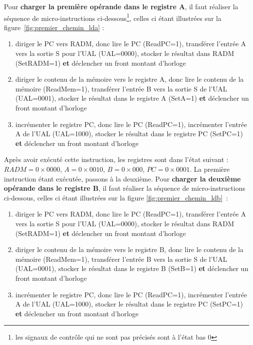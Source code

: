 Pour \textbf{charger la première opérande dans le registre A}, il faut réaliser la séquence de micro-instructions ci-dessous\footnote{les signaux de contrôle qui ne sont pas précisés sont à l'état bas $0$}, celles ci étant illustrées sur la figure~\ref{fig:premier_chemin_lda} :
\begin{enumerate}
\item diriger le PC vers RADM, donc lire le PC (ReadPC=1), transférer l'entrée A vers la sortie S pour l'UAL (UAL=0000), stocker le résultat dans RADM (SetRADM=1) \textbf{et} déclencher un front montant d'horloge
\item diriger le contenu de la mémoire vers le registre A, donc lire le contenu de la mémoire (ReadMem=1), transférer l'entrée B vers la sortie S de l'UAL (UAL=0001), stocker le résultat dans le registre A (SetA=1) \textbf{et} déclencher un front montant d'horloge
\item incrémenter le registre PC, donc lire le PC (ReadPC=1), incrémenter l'entrée A de l'UAL (UAL=1000), stocker le résultat dans le registre PC (SetPC=1) \textbf{et} déclencher un front montant d'horloge
\end{enumerate}

Après avoir exécuté cette instruction, les registres sont dans l'état suivant : $RADM=0\times0000$, $A=0\times0010$, $B=0\times000$, $PC=0\times0001$. La première instruction étant exécutée, passons à la deuxième. Pour \textbf{charger la deuxième opérande dans le registre B}, il faut réaliser la séquence de micro-instructions ci-dessous, celles ci étant illustrées sur la figure \ref{fig:premier_chemin_ldb}~:
\begin{enumerate}
\item diriger le PC vers RADM, donc lire le PC (ReadPC=1), transférer l'entrée A vers la sortie S pour l'UAL (UAL=0000), stocker le résultat dans RADM (SetRADM=1) \textbf{et} déclencher un front montant d'horloge
\item diriger le contenu de la mémoire vers le registre B, donc lire le contenu de la mémoire (ReadMem=1), transférer l'entrée B vers la sortie S de l'UAL (UAL=0001), stocker le résultat dans le registre B (SetB=1) \textbf{et} déclencher un front montant d'horloge
\item incrémenter le registre PC, donc lire le PC (ReadPC=1), incrémenter l'entrée A de l'UAL (UAL=1000), stocker le résultat dans le registre PC (SetPC=1) \textbf{et} déclencher un front montant d'horloge
\end{enumerate}

